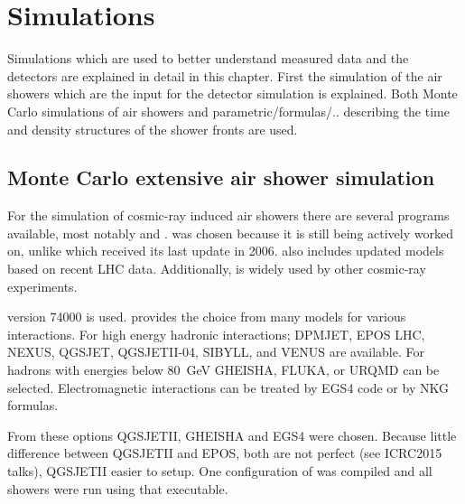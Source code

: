 \chapter{Simulations} \label{ch:simulations}

Simulations which are used to better understand measured data and the
detectors are explained in detail in this chapter. First the simulation
of the air showers which are the input for the detector simulation is
explained. Both Monte Carlo simulations of air showers and
parametric/formulas/.. describing the time and density structures of the
shower fronts are used.


\section{Monte Carlo extensive air shower simulation}

For the simulation of cosmic-ray induced air showers there are several
programs available, most notably \corsika and \aires\cite{sciutto1999}.
\corsika was chosen because it is still being actively worked on, unlike
\aires which received its last update in 2006. \corsika also includes
updated models based on recent LHC data. Additionally, \corsika is widely
used by other cosmic-ray experiments.

\corsika version 74000 is used. \corsika provides the choice from many
models for various interactions. For high energy hadronic interactions;
DPMJET, EPOS LHC\cite{pierog2013}, NEXUS, QGSJET,
QGSJETII-04\cite{ostapchenko2013}, SIBYLL, and VENUS are available. For
hadrons with energies below \SI{80}{\giga\electronvolt}
GHEISHA\cite{fesefeldt1985}, FLUKA, or URQMD can be selected.
Electromagnetic interactions can be treated by EGS4\cite{egs4} code or
by NKG formulas.

From these options QGSJETII, GHEISHA and EGS4 were chosen. Because
little difference between QGSJETII and EPOS, both are not perfect (see
ICRC2015 talks), QGSJETII easier to setup. One configuration of \corsika
was compiled and all showers were run using that executable.

%
%


